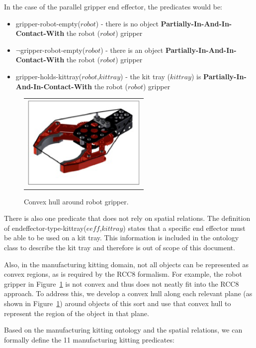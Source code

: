\documentclass[preprint,12pt]{elsarticle}
\newcommand{\const}[1] {$\mathit{#1}$}
\newcommand{\stvar}[1] {\textsf{#1}}
\begin{document}
In the case of the parallel gripper end effector, the predicates would be:
\begin{itemize}
\item \stvar{gripper-robot-empty}(\const{robot}) - there is no object \textbf{Partially-In-And-In-Contact-With} the robot (\const{robot}) gripper
\item $\neg$\stvar{gripper-robot-empty}(\const{robot}) - there is an object \textbf{Partially-In-And-In-Contact-With} the robot (\const{robot}) gripper
\item \stvar{gripper-holds-kittray}(\const{robot},\const{kittray}) - the kit tray (\const{kittray}) is \textbf{Partially-In-And-In-Contact-With} the robot (\const{robot}) gripper
\end{itemize}
\begin{figure}[h!t!]
\begin{center}
\begin{tabular}{c}
\includegraphics[width=6cm]{gripper.eps}
\end{tabular}
\end{center}
\caption{Convex hull around robot gripper.}
\label{fig:gripper}
\end{figure}
There is also one predicate that does not rely on spatial relations. The definition of \stvar{endeffector-type-kittray}(\const{eeff},\const{kittray}) states that a specific end effector must be able to be used on a kit tray. This information is included in the ontology class to describe the kit tray and therefore is out of scope of this document.

Also, in the manufacturing kitting domain, not all objects can be represented as convex regions, as is required by the RCC8 formalism. For example, the robot gripper in Figure~\ref{fig:gripper} is not convex and thus does not neatly fit into the RCC8 approach. To address this, we develop a convex hull along each relevant plane (as shown in Figure~\ref{fig:gripper}) around objects of this sort and use that convex hull to represent the region of the object in that plane.

Based on the manufacturing kitting ontology and the spatial relations, we can formally define the 11 manufacturing kitting predicates:
\end{document}
